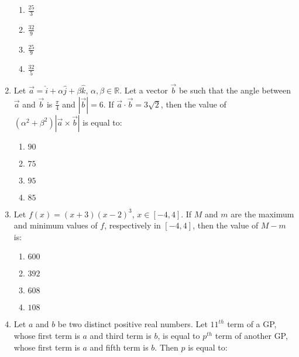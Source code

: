 \documentclass[journal]{IEEEtran}
\newcommand{\brak}[1]{\left( #1 \right)}
\newcommand{\sbrak}[1]{\left[ #1 \right]}
\newcommand{\abs}[1]{\left| #1 \right|}
\begin{document}
\begin{enumerate}
        \begin{multicols}{4}
        \begin{enumerate}
        \item $\frac{25}{3}$
        \item $\frac{32}{9}$
        \item $\frac{25}{9}$
        \item $\frac{32}{5}$
        \end{enumerate}
        \end{multicols}

    \item Let $\vec{a}=\hat{i}+\alpha\hat{j}+\beta\hat{k}$, $\alpha,\beta\in\mathbb{R}$. Let a vector $\vec{b}$ be such that the angle between $\vec{a}$ and $\vec{b}$ is $\frac{\pi}{4}$ and $\abs{\vec{b}}=6$. If $\vec{a}\cdot\vec{b}=3\sqrt{2}$, then the value of $\brak{\alpha^{2}+\beta^{2}}\abs{\vec{a}\times\vec{b}}$ is equal to:

        \begin{multicols}{4}
        \begin{enumerate}
        \item $90$
        \item $75$
        \item $95$
        \item $85$
        \end{enumerate}
        \end{multicols}
        
    \item Let $f\brak{x}=\brak{x+3}\brak{x-2}^{3}$, $x\in\sbrak{-4,4}$. If $M$ and $m$ are the maximum and minimum values of $f$, respectively in $\sbrak{-4,4}$, then the value of $M-m$ is:

        \begin{multicols}{4}
        \begin{enumerate}
        \item $600$
        \item $392$
        \item $608$
        \item $108$
        \end{enumerate}
        \end{multicols}

    \item Let $a$ and $b$ be two distinct positive real numbers. Let $11^{th}$ term of a GP, whose first term is $a$ and third term is $b$, is equal to $p^{th}$ term of another GP, whose first term is $a$ and fifth term is $b$. Then $p$ is equal to:


\end{enumerate}
\end{document}
